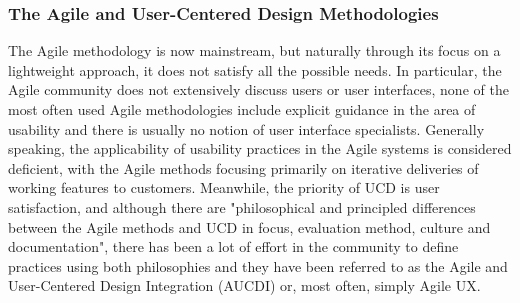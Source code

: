 \documentclass{article}
\begin{document}
\subsubsection{The Agile and User-Centered Design Methodologies}
The Agile methodology is now mainstream, but naturally through its focus on a lightweight approach, it does not satisfy all the possible needs. In particular, the Agile community does not extensively discuss users or user interfaces, none of the most often used Agile methodologies include explicit guidance in the area of usability and there is usually no notion of user interface specialists. Generally speaking, the applicability of usability practices in the Agile systems is considered deficient, with the Agile methods focusing primarily on iterative deliveries of working features to customers. Meanwhile, the priority of UCD is user satisfaction, and although there are "philosophical and principled differences between the Agile methods and UCD in focus, evaluation method, culture and documentation", there has been a lot of effort in the community to define practices using both philosophies and they have been referred to as the Agile and User-Centered Design Integration (AUCDI) or, most often, simply Agile UX. \citep{salah2014systematic}\citep{jurca2014integrating}
\end{document}
